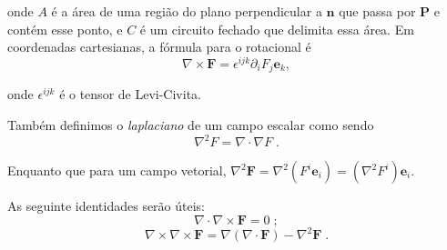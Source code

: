 \noindent onde $A$ é a área de uma região do plano perpendicular a $\mathbf{n}$ que passa por $\mathbf{P}$ e contém esse ponto, e $C$ é um circuito fechado que delimita essa área. Em coordenadas cartesianas, a fórmula para o rotacional é 
\begin{equation}
\nabla \times \mathbf{F} = \epsilon^{ijk}\partial_i F_j \mathbf{e}_k,
\label{eq: xyz_rot}
\end{equation}

\noindent onde $\epsilon^{ijk}$ é o tensor de Levi-Civita.

Também definimos o \textit{laplaciano} de um campo escalar como sendo
\begin{equation}
    \nabla^2 F = \nabla \cdot \nabla F \;.
\end{equation}

\noindent Enquanto que para um campo vetorial, $\nabla^2 \mathbf F = \nabla^2 (F^i \mathbf{e}_i) = (\nabla^2 F^i) \mathbf{e}_i$.

As seguinte identidades serão úteis:
\begin{equation}
    \nabla \cdot \nabla \times \mathbf F = 0 \;;
    \label{eq: div_rot}
\end{equation}
\begin{equation}
    \nabla \times \nabla \times \mathbf F = \nabla(\nabla \cdot \mathbf F) - \nabla^2 \mathbf F \;.
    \label{eq: nabla_identity}
\end{equation}
